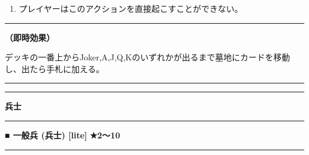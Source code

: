 \documentclass[twocolumn,a5paper,papersize,10pt]{jarticle}
\begin{document}
\vspace{-1zh}%
\begin{enumerate}
\renewcommand{\labelenumi}{※}
\setlength{\leftskip}{-0.3cm}
\setlength{\itemsep}{0pt} %
\setlength{\parskip}{0pt} %

\item プレイヤーはこのアクションを直接起こすことができない。

\vspace{-3mm}%
\end{enumerate}
\vspace{1mm}%
\hrule height 0.1mm depth 0mm width 66.5mm %
\vspace{1mm}%

{\bf（即時効果）}

デッキの一番上からJoker,A,J,Q,Kのいずれかが出るまで墓地にカードを移動し、出たら手札に加える。


\begin{center}
\begin{center}
\hrule height 1mm depth 0mm width 66.5mm %
\vspace{1mm}%
{\Large\bf {}}
\vspace{1mm}%
\hrule height 0.5mm depth 0mm width 66.5mm %
\end{center}
\end{center}
\vspace{-1zh}%


\begin{tcolorbox}
{\scriptsize\bf 兵士}
\end{tcolorbox}
\vspace{-1zh}%
\vspace{2mm} %
\hrule height 0.5mm depth 0mm width 66.5mm %
\vspace{1mm} %
{\small\bf ■ 一般兵 {\scriptsize (兵士) [lite]}} %
\hfill 
{\footnotesize\bf ★2〜10 }

\vspace{1mm}%
\hrule height 0.1mm depth 0mm width 66.5mm %
\vspace{1mm}%
\end{document}
